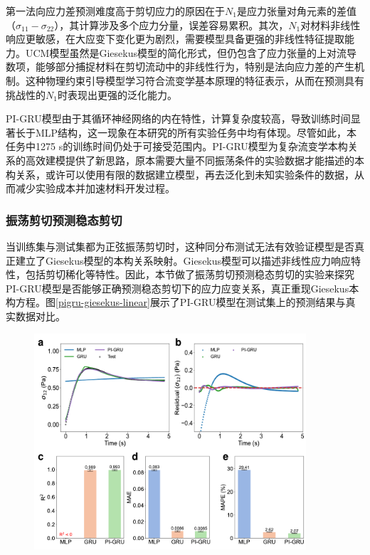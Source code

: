 第一法向应力差预测难度高于剪切应力的原因在于$N_1$是应力张量对角元素的差值（$\sigma_{11}-\sigma_{22}$），其计算涉及多个应力分量，误差容易累积。其次，$N_1$对材料非线性响应更敏感，在大应变下变化更为剧烈，需要模型具备更强的非线性特征提取能力。UCM模型虽然是Giesekus模型的简化形式，但仍包含了应力张量的上对流导数项，能够部分捕捉材料在剪切流动中的非线性行为，特别是法向应力差的产生机制。这种物理约束引导模型学习符合流变学基本原理的特征表示，从而在预测具有挑战性的$N_1$时表现出更强的泛化能力。

PI-GRU模型由于其循环神经网络的内在特性，计算复杂度较高，导致训练时间显著长于MLP结构，这一现象在本研究的所有实验任务中均有体现。尽管如此，本任务中1275 s的训练时间仍处于可接受范围内。PI-GRU模型为复杂流变学本构关系的高效建模提供了新思路，原本需要大量不同振荡条件的实验数据才能描述的本构关系，或许可以使用有限的数据建立模型，再去泛化到未知实验条件的数据，从而减少实验成本并加速材料开发过程。

\subsubsection{振荡剪切预测稳态剪切}
当训练集与测试集都为正弦振荡剪切时，这种同分布测试无法有效验证模型是否真正建立了Giesekus模型的本构关系映射。Giesekus模型可以描述非线性应力响应特性，包括剪切稀化等特性。因此，本节做了振荡剪切预测稳态剪切的实验来探究PI-GRU模型是否能够正确预测稳态剪切下的应力应变关系，真正重现Giesekus本构方程。图\ref{pigru-giesekus-linear}展示了PI-GRU模型在测试集上的预测结果与真实数据对比。
\begin{figure}
  \centering
  \includegraphics[width=0.9\textwidth]{Fig/pigru-giesekus-linear.pdf}
\end{figure}

